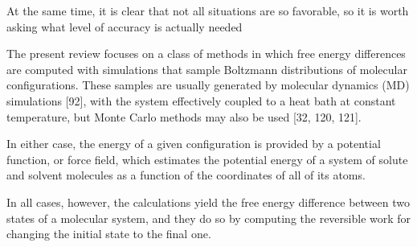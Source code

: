 At the same time, it is clear that not all situations are
so favorable, so it is worth asking what level of accuracy
is actually needed

The present review focuses on a class of methods in
which free energy differences are computed with simulations that sample Boltzmann distributions of molecular configurations. These samples are usually generated by molecular dynamics (MD) simulations [92], with
the system effectively coupled to a heat bath at constant temperature, but Monte Carlo methods may also
be used [32, 120, 121]. 

In either case, the energy of a
given configuration is provided by a potential function,
or force field, which estimates the potential energy of
a system of solute and solvent molecules as a function
of the coordinates of all of its atoms.

In
all cases, however, the calculations yield the free energy
difference between two states of a molecular system, and
they do so by computing the reversible work for changing
the initial state to the final one. 
